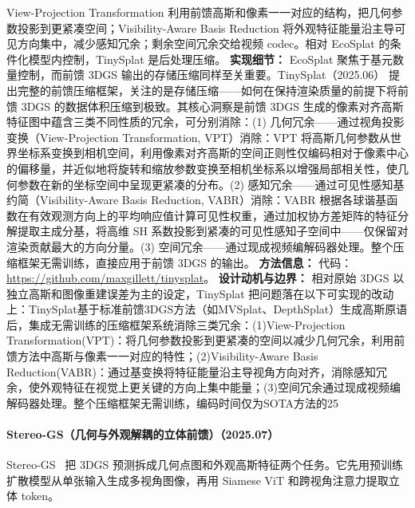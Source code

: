 View-Projection Transformation 利用前馈高斯和像素一一对应的结构，把几何参数投影到更紧凑空间；Visibility-Aware Basis Reduction 将外观特征能量沿主导可见方向集中，减少感知冗余；剩余空间冗余交给视频 codec。相对 EcoSplat 的条件化模型内控制，TinySplat 是后处理压缩。
\textbf{实现细节：} EcoSplat 聚焦于基元数量控制，而前馈 3DGS 输出的存储压缩同样至关重要。TinySplat（2025.06） 提出完整的前馈压缩框架，关注的是存储压缩——如何在保持渲染质量的前提下将前馈 3DGS 的数据体积压缩到极致。其核心洞察是前馈 3DGS 生成的像素对齐高斯特征图中蕴含三类不同性质的冗余，可分别消除：(1) 几何冗余——通过视角投影变换（View-Projection Transformation, VPT）消除：VPT 将高斯几何参数从世界坐标系变换到相机空间，利用像素对齐高斯的空间正则性仅编码相对于像素中心的偏移量，并近似地将旋转和缩放参数变换至相机坐标系以增强局部相关性，使几何参数在新的坐标空间中呈现更紧凑的分布。(2) 感知冗余——通过可见性感知基约简（Visibility-Aware Basis Reduction, VABR）消除：VABR 根据各球谐基函数在有效观测方向上的平均响应值计算可见性权重，通过加权协方差矩阵的特征分解提取主成分基，将高维 SH 系数投影到紧凑的可见性感知子空间中——仅保留对渲染贡献最大的方向分量。(3) 空间冗余——通过现成视频编解码器处理。整个压缩框架无需训练，直接应用于前馈 3DGS 的输出。
\textbf{方法信息：} 代码：\url{https://github.com/maxgillett/tinysplat}。
\textbf{设计动机与边界：} 相对原始 3DGS 以独立高斯和图像重建误差为主的设定，TinySplat 把问题落在以下可实现的改动上：TinySplat基于标准前馈3DGS方法（如MVSplat、DepthSplat）生成高斯原语后，集成无需训练的压缩框架系统消除三类冗余：(1)View-Projection Transformation(VPT)：将几何参数投影到更紧凑的空间以减少几何冗余，利用前馈方法中高斯与像素一一对应的特性；(2)Visibility-Aware Basis Reduction(VABR)：通过基变换将特征能量沿主导视角方向对齐，消除感知冗余，使外观特征在视觉上更关键的方向上集中能量；(3)空间冗余通过现成视频编解码器处理。整个压缩框架无需训练，编码时间仅为SOTA方法的25%
\paragraph{Stereo-GS（几何与外观解耦的立体前馈）（2025.07）}
Stereo-GS~\cite{2507_14921} 把 3DGS 预测拆成几何点图和外观高斯特征两个任务。它先用预训练扩散模型从单张输入生成多视角图像，再用 Siamese ViT 和跨视角注意力提取立体 token。

